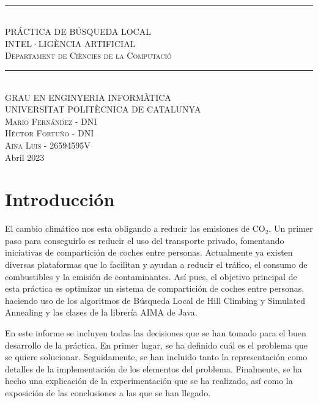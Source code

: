 \documentclass[10pt]{article}
\begin{document}
\begin{titlepage}

\newcommand{\HRule}{\rule{\linewidth}{0.5mm}}
\center
\textsc{ }\\[9cm]

\HRule \\[0.8cm]
{\LARGE PRÁCTICA DE BÚSQUEDA LOCAL}\\[1cm]
\textsc{INTEL·LIGÈNCIA ARTIFICIAL}\\
\textsc{Departament de Ciències de la Computació}\\[0.5cm]
\HRule \\[1cm]

\textsc{GRAU EN ENGINYERIA INFORMÀTICA}\\
\textsc{UNIVERSITAT POLITÈCNICA DE CATALUNYA}\\[9cm]

\vfill
\textsc{Mario Fernández - DNI} \\ [0.3cm]
\textsc{Héctor Fortuño - DNI}\\[0.3cm]
\textsc{Aina Luis - 26594595V}\\[0.3cm]
{\large Abril 2023}\\

\end{titlepage}

\pagestyle{empty}


\newpage
\tableofcontents
\newpage
\setcounter{page}{1}
\pagestyle{plain}
\section{Introducción}
El cambio climático nos esta obligando a reducir las emisiones de CO$_{2}$. Un primer paso para conseguirlo es reducir el uso del transporte privado, fomentando iniciativas de compartición de coches entre personas. Actualmente ya existen diversas plataformas que lo facilitan y ayudan a reducir el tráfico, el consumo de combustibles y la emisión de contaminantes. Así pues, el objetivo principal de esta práctica es optimizar un sistema de compartición de coches entre personas, haciendo uso de los algoritmos de Búsqueda Local de Hill Climbing y Simulated Annealing y las clases de la librería AIMA de Java.

En este informe se incluyen todas las decisiones que se han tomado para el buen desarrollo de la práctica. En primer lugar, se ha definido cuál es el problema que se quiere solucionar. Seguidamente, se han incluido tanto la representación como detalles de la implementación de los elementos del problema. Finalmente, se ha hecho una explicación de la experimentación que se ha realizado, así como la exposición de las conclusiones a las que se han llegado.
\end{document}
